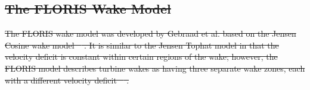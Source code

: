 \documentclass[a4paper]{jpconf}
\providecommand{\DIFdel}[1]{{\protect\color{red}\sout{#1}}}                      %
\providecommand{\DIFdelbegin}{} %
\providecommand{\DIFdelend}{} %
\newcommand{\DIFscaledelfig}{0.5}
\newlength{\DIFdelgraphicswidth} %
\newlength{\DIFdelgraphicsheight} %
\newcommand{\DIFdelincludegraphics}[2][]{%
\sbox{\DIFdelgraphicsbox}{\DIFOincludegraphics[#1]{#2}}%
\settoboxwidth{\DIFdelgraphicswidth}{\DIFdelgraphicsbox} %
\settoboxtotalheight{\DIFdelgraphicsheight}{\DIFdelgraphicsbox} %
\scalebox{\DIFscaledelfig}{%
\parbox[b]{\DIFdelgraphicswidth}{\usebox{\DIFdelgraphicsbox}\\[-\baselineskip] \rule{\DIFdelgraphicswidth}{0em}}\llap{\resizebox{\DIFdelgraphicswidth}{\DIFdelgraphicsheight}{%
\setlength{\unitlength}{\DIFdelgraphicswidth}%
\begin{picture}(1,1)%
\thicklines\linethickness{2pt} %
{\color[rgb]{1,0,0}\put(0,0){\framebox(1,1){}}}%
{\color[rgb]{1,0,0}\put(0,0){\line( 1,1){1}}}%
{\color[rgb]{1,0,0}\put(0,1){\line(1,-1){1}}}%
\end{picture}%
}\hspace*{3pt}}} %
} %
\DeclareRobustCommand{\DIFdelbegin}{\DIFOdelbegin \let\includegraphics\DIFdelincludegraphics} %
\DeclareRobustCommand{\DIFdelend}{\DIFOaddend \let\includegraphics\DIFOincludegraphics} %
\begin{document}


\DIFdelbegin \subsection{\DIFdel{The FLORIS Wake Model}}
\addtocounter{subsection}{-1}%
\DIFdel{The FLORIS wake model was developed by Gebraad et al. based on the Jensen Cosine wake model \mbox{%
\cite{gebraad2014}}\hspace{0pt}%
. It is similar to the Jensen Tophat model in that the velocity deficit is constant within certain regions of the wake; however, the FLORIS model describes turbine wakes as having three separate wake zones, each with a different velocity deficit %
\mbox{%
\cite{gebraad2014}}\hspace{0pt}%
.
}\DIFdelend %
\end{document}

